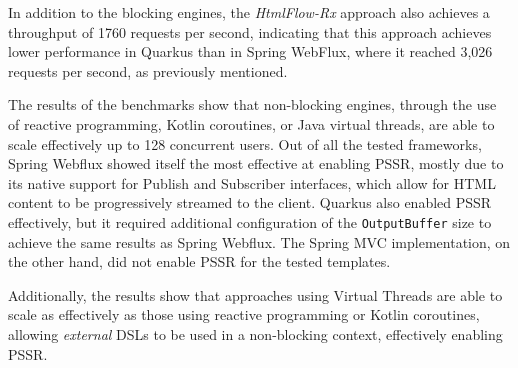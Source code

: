 In addition to the blocking engines, the \textit{HtmlFlow-Rx} approach also
achieves a throughput of 1760 requests per second, indicating that this
approach achieves lower performance in Quarkus than in Spring WebFlux, where it
reached 3,026 requests per second, as previously mentioned.

The results of the benchmarks show that non-blocking engines, through the use
of reactive programming, Kotlin coroutines, or Java virtual threads, are able
to scale effectively up to 128 concurrent users. Out of all the tested
frameworks, Spring Webflux showed itself the most effective at enabling PSSR,
mostly due to its native support for Publish and Subscriber interfaces, which
allow for HTML content to be progressively streamed to the client. Quarkus also
enabled PSSR effectively, but it required additional configuration of the
\texttt{OutputBuffer} size to achieve the same results as Spring Webflux. The
Spring MVC implementation, on the other hand, did not enable PSSR for the
tested templates.

Additionally, the results show that approaches using Virtual Threads are able
to scale as effectively as those using reactive programming or Kotlin
coroutines, allowing \textit{external} DSLs to be used in a non-blocking
context, effectively enabling PSSR\@.